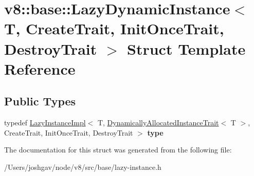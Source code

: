 \hypertarget{structv8_1_1base_1_1_lazy_dynamic_instance}{}\section{v8\+:\+:base\+:\+:Lazy\+Dynamic\+Instance$<$ T, Create\+Trait, Init\+Once\+Trait, Destroy\+Trait $>$ Struct Template Reference}
\label{structv8_1_1base_1_1_lazy_dynamic_instance}
\subsection*{Public Types}
\begin{DoxyCompactItemize}
\item 
typedef \hyperlink{structv8_1_1base_1_1_lazy_instance_impl}{Lazy\+Instance\+Impl}$<$ T, \hyperlink{structv8_1_1base_1_1_dynamically_allocated_instance_trait}{Dynamically\+Allocated\+Instance\+Trait}$<$ T $>$, Create\+Trait, Init\+Once\+Trait, Destroy\+Trait $>$ {\bfseries type}\hypertarget{structv8_1_1base_1_1_lazy_dynamic_instance_a86754cf35cdf03a9ca60d5fd16352ac1}{}\label{structv8_1_1base_1_1_lazy_dynamic_instance_a86754cf35cdf03a9ca60d5fd16352ac1}

\end{DoxyCompactItemize}


The documentation for this struct was generated from the following file\+:\begin{DoxyCompactItemize}
\item 
/\+Users/joshgav/node/v8/src/base/lazy-\/instance.\+h\end{DoxyCompactItemize}
